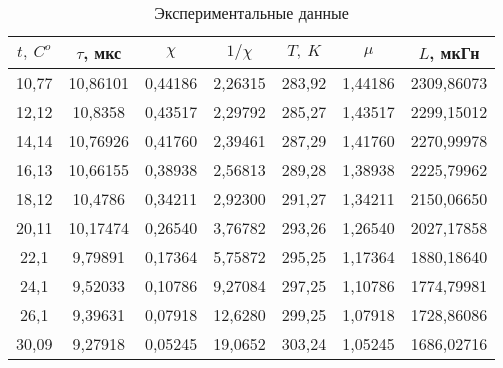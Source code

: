 \begin{table}[]
    \begin{center}
        \begin{tabular}{|c|c|c|c|c|c|c|}
            \hline
            $t, ~ C^o$ & $\tau$, мкс & $\chi$    & $1/\chi$  & $T, ~ K$ & $\mu$    & $L$, мкГн  \\ \hline
            10,77      & 10,86101    & 0,44186   & 2,26315   & 283,92   & 1,44186  & 2309,86073  \\ \hline
            12,12      & 10,8358     & 0,43517   & 2,29792   & 285,27   & 1,43517  & 2299,15012  \\ \hline
            14,14      & 10,76926    & 0,41760   & 2,39461   & 287,29   & 1,41760  & 2270,99978  \\ \hline
            16,13      & 10,66155    & 0,38938   & 2,56813   & 289,28   & 1,38938  & 2225,79962  \\ \hline
            18,12      & 10,4786     & 0,34211   & 2,92300   & 291,27   & 1,34211  & 2150,06650  \\ \hline
            20,11      & 10,17474    & 0,26540   & 3,76782   & 293,26   & 1,26540  & 2027,17858  \\ \hline
            22,1       & 9,79891     & 0,17364   & 5,75872   & 295,25   & 1,17364  & 1880,18640  \\ \hline
            24,1       & 9,52033     & 0,10786   & 9,27084   & 297,25   & 1,10786  & 1774,79981  \\ \hline
            26,1       & 9,39631     & 0,07918   & 12,6280   & 299,25   & 1,07918  & 1728,86086  \\ \hline
            30,09      & 9,27918     & 0,05245   & 19,0652   & 303,24   & 1,05245  & 1686,02716  \\ \hline
        \end{tabular}
    \end{center}
    \caption{Экспериментальные данные}
    \label{experiment_table}
\end{table}